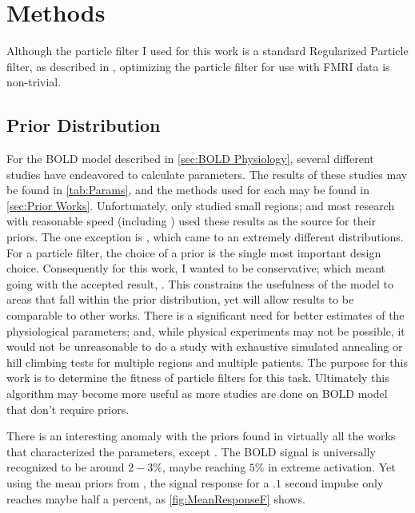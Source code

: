 \chapter{Methods}
\label{sec:Methods}
Although the particle filter I used for this work is a standard Regularized
Particle filter, as described in \cite{Arulampalam2002a}, optimizing the 
particle filter for use with FMRI data is non-trivial. 

\section{Prior Distribution}
\label{sec:PriorDist}
For the BOLD model described in \autoref{sec:BOLD Physiology}, several
different studies have endeavored to calculate parameters. The results
of these studies may be found in \autoref{tab:Params}, and the methods 
used for each may be found in \autoref{sec:Prior Works}. Unfortunately,
\cite{Friston2000} only studied small regions; and most research with
reasonable speed (including \cite{Friston2002b}) used these results as 
the source for their priors. 
The one exception is \cite{Johnston2008}, which came to an extremely different
distributions. For a particle filter, the choice of a prior is
the single most important design choice. Consequently for this work,
I wanted to be conservative; which meant going with the accepted result,
\cite{Friston2000}. This constrains the usefulness of the model to
areas that fall within the prior distribution, yet will allow results
to be comparable to other works. There is a significant need for better
estimates of the physiological parameters; and, while physical experiments
may not be possible, it would not be unreasonable to do a study with
exhaustive simulated annealing or hill climbing tests for multiple
regions and multiple patients. The purpose for this work is to determine
the fitness of particle filters for this task. Ultimately this algorithm may become
more useful as more studies are done on BOLD model that don't require
priors. 

There is an interesting anomaly with the priors found in virtually all
the works that characterized the parameters, except \cite{Johnston2008}.
The BOLD signal is universally recognized to be around $2-3\%$, maybe
reaching $5\%$ in extreme activation. Yet using the mean priors
from \cite{Friston2000}, the signal response for a $.1$ second
impulse only reaches maybe half a percent, as \autoref{fig:MeanResponseF}
shows.

